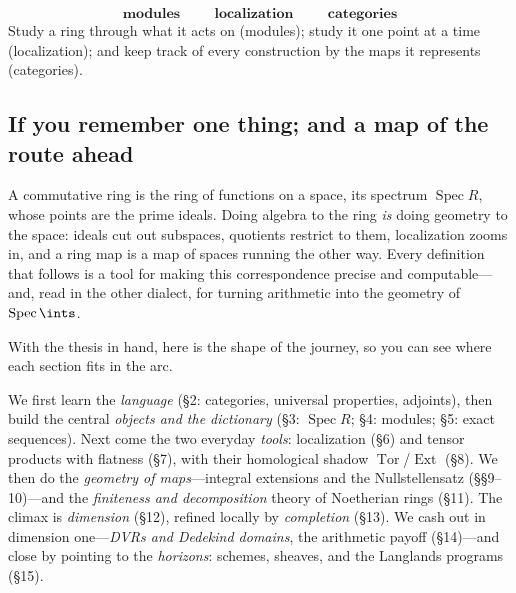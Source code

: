 \documentclass[11pt]{article}
\DeclareMathOperator{\Spec}{Spec}
\DeclareMathOperator{\Tor}{Tor}
\DeclareMathOperator{\Ext}{Ext}
\begin{document}
\begin{eequation}
\[
\boxed{\ \textbf{modules}\ }\qquad \boxed{\ \textbf{localization}\ }\qquad \boxed{\ \textbf{categories}\ }
\]
Study a ring through what it acts on (modules); study it one point at a time (localization);
and keep track of every construction by the maps it represents (categories).
\end{eequation}

\subsection{If you remember one thing; and a map of the route ahead}

\begin{iidea}
A commutative ring is the ring of functions on a space, its spectrum $\Spec R$, whose points
are the prime ideals. Doing algebra to the ring \emph{is} doing geometry to the space:
ideals cut out subspaces, quotients restrict to them, localization zooms in, and a ring map
is a map of spaces running the other way. Every definition that follows is a tool for making
this correspondence precise and computable---and, read in the other dialect, for turning
arithmetic into the geometry of $\Spec\ints$.
\end{iidea}

With the thesis in hand, here is the shape of the journey, so you can see where each section
fits in the arc.

\begin{ppreview}
We first learn the \emph{language} (\S2: categories, universal properties, adjoints), then
build the central \emph{objects and the dictionary} (\S3: $\Spec R$; \S4: modules; \S5:
exact sequences). Next come the two everyday \emph{tools}: localization (\S6) and tensor
products with flatness (\S7), with their homological shadow $\Tor$/$\Ext$ (\S8). We then do
the \emph{geometry of maps}---integral extensions and the Nullstellensatz (\S\S9--10)---and
the \emph{finiteness and decomposition} theory of Noetherian rings (\S11). The climax is
\emph{dimension} (\S12), refined locally by \emph{completion} (\S13). We cash out in
dimension one---\emph{DVRs and Dedekind domains}, the arithmetic payoff (\S14)---and close
by pointing to the \emph{horizons}: schemes, sheaves, and the Langlands programs (\S15).
\end{ppreview}
\end{document}

